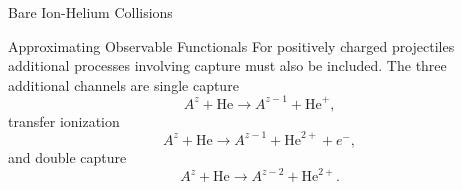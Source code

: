 \documentclass[letterpaper, 11 pt]{report}
\begin{document}
\begin{chapter}{Bare Ion-Helium Collisions \label{chap:p-he2p-he}}
\begin{section}{Approximating Observable Functionals \label{sec:phe2p-obs}}
      For positively charged projectiles additional processes involving capture must also be included.
      The three additional channels are single capture
      \begin{equation} \label{eq:TP}
         A^z + \mathrm{He} \rightarrow A^{z-1} + \mathrm{He}^{+},
      \end{equation}
      transfer ionization
      \begin{equation} \label{eq:IP}
         A^z + \mathrm{He} \rightarrow A^{z-1} + \mathrm{He}^{2+} + e^-,
      \end{equation}
      and double capture
      \begin{equation} \label{eq:PP}
         A^z + \mathrm{He} \rightarrow A^{z-2} + \mathrm{He}^{2+}.
      \end{equation}


\end{section}
\end{chapter}
\end{document}
